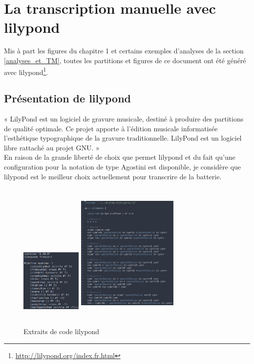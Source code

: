 \section{La transcription manuelle avec lilypond}
\label{tm}
Mis à part les figures du chapitre 1 et certains exemples d’analyses de la
section \ref{analyses_et_TM}, toutes les partitions et figures de ce document
ont été généré avec lilypond\footnote{\url{http://lilypond.org/index.fr.html}}.\\

\subsection*{Présentation de lilypond}
« LilyPond est un logiciel de gravure musicale, destiné à produire des
partitions de qualité optimale. Ce projet apporte à l’édition musicale
informatisée l’esthétique typographique de la gravure traditionnelle. LilyPond
est un logiciel libre rattaché au projet GNU. »\\

En raison de la grande liberté de choix que permet lilypond et du fait qu’une
configuration pour la notation de type Agostini est disponible, je considère
que lilypond est le meilleur choix actuellement pour transcrire de la batterie.

\begin{figure}[h]
    \centering
    \includegraphics[height=40mm, width=30mm]{
    z_images/3_methodes/transcription_manuelle/drum_perso_1}
    \includegraphics[height=70mm, width=50mm]{
    z_images/3_methodes/transcription_manuelle/extrait_code.png}
    \caption{Extraits de code lilypond}
    \label{extrait_code}
\end{figure}

